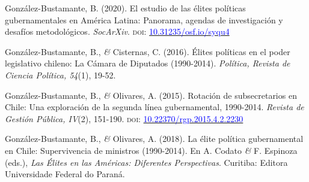 \documentclass[a4paper]{tufte-handout}
\begin{document}
{\begin{list}{}
\item{\small González-Bustamante, B. (2020). El estudio de las élites políticas gubernamentales en América Latina: Panorama, agendas de investigación y desafíos metodológicos. {\itshape SocArXiv}. {\scshape doi:} \href{https://doi.org/10.31235/osf.io/syqu4}{\textcolor{blue}{10.31235/osf.io/syqu4}}}


\item{\small Gonz\'alez-Bustamante, B., {\itshape \&} Cisternas, C. (2016). \'Elites pol\'iticas en el poder legislativo chileno: La C\'amara de Diputados (1990-2014). {\itshape Pol\'itica, Revista de Ciencia Pol\'itica, 54}(1), 19-52.}

\item{\small Gonz\'alez-Bustamante, B., {\itshape \&} Olivares, A. (2015). Rotaci\'on de subsecretarios en Chile: Una exploraci\'on de la segunda l\'inea gubernamental, 1990-2014. {\itshape Revista de Gesti\'on P\'ublica, IV}(2), 151-190. {\scshape doi:} \href{https://doi.org/10.22370/rgp.2015.4.2.2230}{\textcolor{blue}{10.22370/rgp.2015.4.2.2230}}}


\item{\small Gonz\'alez-Bustamante, B., {\itshape \&} Olivares, A. (2018). La \'elite pol\'itica gubernamental en Chile: Supervivencia de ministros (1990-2014). En A. Codato {\itshape \&} F. Espinoza (eds.),{ \itshape Las \'Elites en las Am\'ericas: Diferentes Perspectivas}. Curitiba: Editora Universidade Federal do Paran\'a.}


\end{list}}
\end{document}
